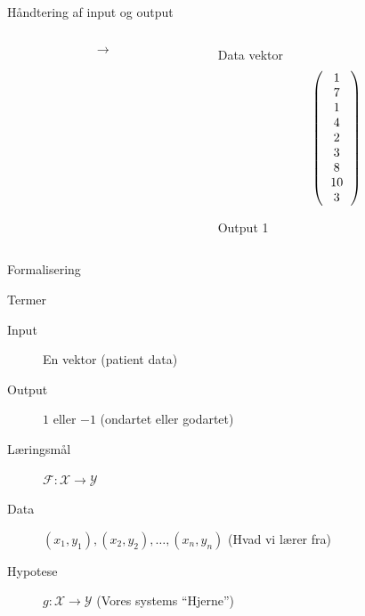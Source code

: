 \documentclass[12pt,t]{beamer}
\begin{document}
\begin{frame}[c]{Håndtering af input og output}
\begin{columns}
            \begin{column}{0.1\textwidth}
                \vspace{4em}
                \begin{Huge}
                    $$
                        \rightarrow
                    $$
                \end{Huge}
            \end{column}
            \begin{column}{0.3\textwidth}
                \begin{block}{Data vektor}
                    $$
                        \left(
                        \begin{tabular}{c}
                            1      \\
                            7      \\
                            1      \\
                            4      \\
                            2      \\
                            3      \\
                            8      \\
                            10     \\
                            3
                        \end{tabular}
                        \right)
                    $$
                \end{block}
                \vspace{-1em}
                \begin{block}{Output}
                    1
                \end{block}
            \end{column}
        \end{columns}
    \end{frame}

    \begin{frame}[t]{Formalisering}
        \begin{block}{Termer}
            \begin{description}
                \item[Input] En vektor (patient data)  \pause
                \item[Output] $1$ eller $-1$ (ondartet eller godartet) \pause
                \item[Læringsmål]$\mathcal{F}: \mathcal{X} \rightarrow
                                   \mathcal{Y}$ \pause
                \item[Data] $(x_1,y_1), (x_2,y_2),\dots,(x_n,y_n)$
                (Hvad vi lærer fra) \pause
                \item[Hypotese] $g: \mathcal{X} \rightarrow
                                   \mathcal{Y}$ (Vores systems ``Hjerne'')
            \end{description}
        \end{block}
    \end{frame}
\end{document}
